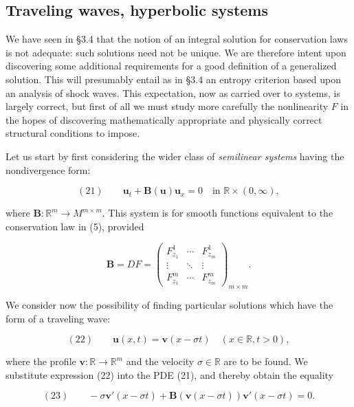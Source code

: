 \begin{figure}[h]\centering
\end{figure}

\subsection{Traveling waves, hyperbolic systems}\label{sec:traveling-waves-hyperbolic-systems}

We have seen in \S3.4 that the notion of an integral solution for conservation laws is not adequate: such solutions need not be unique. We are therefore intent upon discovering some additional requirements for a good definition of a generalized solution. This will presumably entail as in \S3.4 an entropy criterion based upon an analysis of shock waves. This expectation, now as carried over to systems, is largely correct, but first of all we must study more carefully the nonlinearity $F$ in the hopes of discovering mathematically appropriate and physically correct structural conditions to impose.

Let us start by first considering the wider class of \textit{semilinear systems} having the nondivergence form:

$$(21) \qquad \mathbf{u}_t + \mathbf{B}(\mathbf{u})\mathbf{u}_x = 0 \quad \text{in } \mathbb{R}\times(0,\infty),$$

where $\mathbf{B}:\mathbb{R}^m\to M^{m\times m}$. This system is for smooth functions equivalent to the conservation law in (5), provided

$$\mathbf{B} = DF = \begin{pmatrix} F_{z_1}^1 & \cdots & F_{z_m}^1 \\ \vdots & \ddots & \vdots \\ F_{z_1}^m & \cdots & F_{z_m}^m \end{pmatrix}_{m\times m}.$$

We consider now the possibility of finding particular solutions which have the form of a traveling wave:

$$(22) \qquad \mathbf{u}(x,t) = \mathbf{v}(x-\sigma t) \quad (x\in\mathbb{R}, t>0),$$

where the profile $\mathbf{v}:\mathbb{R}\to\mathbb{R}^m$ and the velocity $\sigma\in\mathbb{R}$ are to be found. We substitute expression (22) into the PDE (21), and thereby obtain the equality

$$(23) \qquad -\sigma\mathbf{v}'(x-\sigma t) + \mathbf{B}(\mathbf{v}(x-\sigma t))\mathbf{v}'(x-\sigma t) = 0.$$

